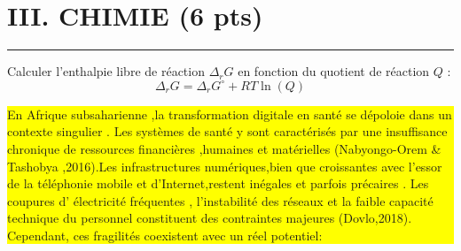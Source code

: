 \documentclass[french,12pt,a4paper]{article}
\begin{document}
	\section*{III. CHIMIE (6 pts)}
	 	\noindent\textcolor{green}{\rule{17cm}{0.05cm}}
	Calculer l’enthalpie libre de réaction $\Delta_r G$ en fonction du quotient de réaction $Q$ :
	\[\Delta_r G = \Delta_r G^\circ + RT \ln(Q)	\]
 
	\colorbox{yellow}{\parbox{\linewidth}{En Afrique subsaharienne ,la transformation digitale en santé se dépoloie dans un contexte singulier . Les systèmes de santé y sont caractérisés par une insuffisance chronique de ressources financières ,humaines et matérielles (Nabyongo-Orem \&  Tashobya ,2016).Les infrastructures numériques,bien que croissantes avec l'essor de la téléphonie mobile et d'Internet,restent inégales et parfois précaires . Les coupures d' électricité fréquentes , l'instabilité des réseaux et la faible capacité technique du personnel constituent des contraintes majeures (Dovlo,2018). Cependant, ces fragilités coexistent avec un réel potentiel: }}
	
  
\end{document}

